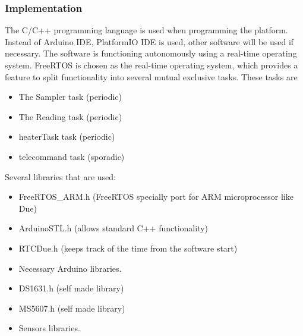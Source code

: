 \subsubsection{Implementation}\label{sec:4.8.3}
The C/C++ programming language is used when programming the platform. Instead of Arduino IDE, PlatformIO IDE is used, other software will be used if necessary. The software is functioning autonomously using a real-time operating system. FreeRTOS is chosen as the real-time operating system, which provides a feature to split functionality into several mutual exclusive tasks. These tasks are \begin{itemize}
    \item The Sampler task (periodic)
    \item The Reading task (periodic)
    \item heaterTask task (periodic)
    \item telecommand task (sporadic)
\end{itemize} 
Several libraries that are used:
\begin{itemize}
    \item FreeRTOS\_ARM.h (FreeRTOS specially port for ARM microprocessor like Due)
    \item ArduinoSTL.h (allows standard C++ functionality)
    \item RTCDue.h (keeps track of the time from the software start)
    \item Necessary Arduino libraries.
    \item DS1631.h (self made library)
    \item MS5607.h (self made library)
    \item Sensors libraries.
\end{itemize}


\raggedbottom